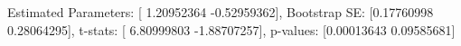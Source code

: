 Estimated Parameters: [ 1.20952364 -0.52959362], Bootstrap SE: [0.17760998 0.28064295], t-stats: [ 6.80999803 -1.88707257], p-values: [0.00013643 0.09585681]